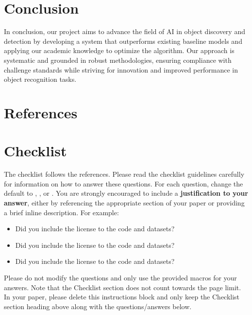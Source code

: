 \documentclass{article}
\begin{document}
	\section{Conclusion}
	In conclusion, our project aims to advance the field of AI in object discovery and detection by developing a system that outperforms existing baseline models and applying our academic knowledge to optimize the algorithm. Our approach is systematic and grounded in robust methodologies, ensuring compliance with challenge standards while striving for innovation and improved performance in object recognition tasks.
	
	
	
	\section*{References}
	
	
	
	\section*{Checklist}
	
	
	The checklist follows the references.  Please
	read the checklist guidelines carefully for information on how to answer these
	questions.  For each question, change the default \answerTODO{} to \answerYes{},
	\answerNo{}, or \answerNA{}.  You are strongly encouraged to include a {\bf
		justification to your answer}, either by referencing the appropriate section of
	your paper or providing a brief inline description.  For example:
	\begin{itemize}
		\item Did you include the license to the code and datasets? 
		\item Did you include the license to the code and datasets? 
		\item Did you include the license to the code and datasets? \answerNA{}
	\end{itemize}
	Please do not modify the questions and only use the provided macros for your
	answers.  Note that the Checklist section does not count towards the page
	limit.  In your paper, please delete this instructions block and only keep the
	Checklist section heading above along with the questions/answers below.
	
\end{document}

